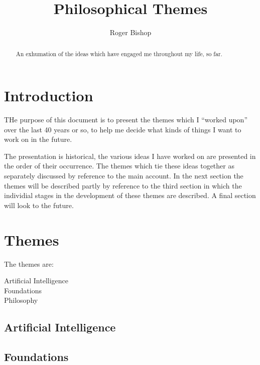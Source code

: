 \documentclass{rbjk}
\begin{document}
                                                                                   
\begin{article}
\begin{opening}  
\title{Philosophical Themes}
\author{Roger Bishop }

\begin{abstract}
An exhumation of the ideas which have engaged me throughout my life, so far.
\end{abstract}
\end{opening}

\tableofcontents

\section{Introduction}

THe purpose of this document is to present the themes which I ``worked upon'' over the last 40 years or so, to help me decide what kinds of things I want to work on in the future.

The presentation is historical, the various ideas I have worked on are presented in the order of their occurrence.
The themes which tie these ideas together as separately discussed by reference to the main account.
In the next section the themes will be described partly by reference to the third section in which the individial stages in the development of these themes are described.
A final section will look to the future.

\section{Themes}

The themes are:
\begin{description}
\item[Artificial Intelligence]
\item[Foundations]
\item[Philosophy]
\end{description}

\subsection{Artificial Intelligence}

\subsection{Foundations}


\end{article}
\end{document}
